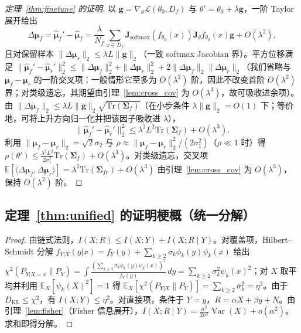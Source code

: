 \begin{proof}[定理~\ref{thm:finetune} 的证明]
以 $\mathbf{g}=\nabla_\theta\mathcal{L}(\theta_0,D_f)$ 与 $\theta'=\theta_0+\lambda\mathbf{g}$，一阶 Taylor 展开给出
\begin{equation}
\Delta\boldsymbol{\mu}_f=\hat{\boldsymbol{\mu}}_f'-\hat{\boldsymbol{\mu}}_f=\frac{\lambda}{N_f}\sum_{x\in D_f}\mathbf{J}_{\mathrm{softmax}}(f_{\theta_0}(x))\mathbf{J}_\theta f_{\theta_0}(x)\mathbf{g}+O(\lambda^2),
\end{equation}
且对保留样本 $\|\Delta\boldsymbol{\mu}_r\|_2\le\lambda L\|\mathbf{g}\|_2$（一致 softmax Jacobian 界）。平方位移满足 $\|\hat{\boldsymbol{\mu}}_f'-\hat{\boldsymbol{\mu}}_r'\|_2^2\le\|\Delta\boldsymbol{\mu}_f\|_2^2+\|\Delta\boldsymbol{\mu}_r\|_2^2+2\|\Delta\boldsymbol{\mu}_f\|_2\|\Delta\boldsymbol{\mu}_r\|_2$（我们省略与 $\boldsymbol{\mu}_f-\boldsymbol{\mu}_r$ 的一阶交叉项：一般情形它至多为 $O(\lambda^2)$ 阶，因此不改变首阶 $O(\lambda^2)$ 界；对类级遗忘，其期望由引理~\ref{lem:cross_cov} 为 $O(\lambda^3)$，故可吸收进余项）。由 $\|\Delta\boldsymbol{\mu}_f\|_2\le\lambda L\|\mathbf{g}\|_2\sqrt{\mathrm{Tr}(\boldsymbol{\Sigma}_f)}$（在小步条件 $\lambda\|\mathbf{g}\|_2=O(1)$ 下；等价地，可将上升方向归一化并把该因子吸收进 $\lambda$），
\begin{equation}
\|\hat{\boldsymbol{\mu}}_f'-\hat{\boldsymbol{\mu}}_r'\|_2^2\le\lambda^2L^2\mathrm{Tr}(\boldsymbol{\Sigma}_f)+O(\lambda^3).
\end{equation}
利用 $\|\boldsymbol{\mu}_f-\boldsymbol{\mu}_r\|_2=\sqrt{2}\sigma_2$ 与 $\rho\approx\|\boldsymbol{\mu}_f-\boldsymbol{\mu}_r\|_2^2/(2\sigma_1^2)$（$\rho\ll1$ 时）得 $\rho(\theta')\le\frac{\lambda^2L^2}{2\sigma_1^2}\mathrm{Tr}(\boldsymbol{\Sigma}_f)+O(\lambda^3)$。对类级遗忘，交叉项 $\mathbb{E}[\langle\Delta\boldsymbol{\mu}_f,\Delta\boldsymbol{\mu}_r\rangle]=\lambda^2\mathrm{Tr}(\boldsymbol{\Sigma}_{fr})+O(\lambda^3)$ 由引理~\ref{lem:cross_cov} 为 $O(\lambda^3)$，保持 $O(\lambda^2)$ 阶。
\end{proof}

\subsection{定理~\ref{thm:unified} 的证明梗概（统一分解）}
\label{app:unified}
\begin{proof}
由链式法则，$I(X;R) \le I(X;Y) + I(X;R\mid Y)$。对覆盖项，Hilbert--Schmidt 分解 $f_{Y|X}(y|x) = f_Y(y) + \sum_{k\ge 2}\sigma_k\phi_k(y)\psi_k(x)$ 给出 $\chi^2(P_{Y|X=x}\|P_Y)=\int\frac{(\sum_{k\ge2}\sigma_k\phi_k(y)\psi_k(x))^2}{f_Y(y)}\,dy=\sum_{k\ge2}\sigma_k^2\psi_k(x)^2$；对 $X$ 取平均并利用 $\mathbb{E}_X[\psi_k(X)^2]=1$ 得 $\mathbb{E}_X[\chi^2(P_{Y|X}\|P_Y)] = \sum_{k\ge 2}\sigma_k^2 = \eta^2$。由于 $D_{\mathrm{KL}} \le \chi^2$，有 $I(X;Y) \le \eta^2$。对直接项，条件于 $Y=y$，$R = \alpha X + \beta y + N$。由引理~\ref{lem:fisher}（Fisher 信息展开），$I(X;R\mid Y) = \frac{\alpha^2}{2\sigma^2}\operatorname{Var}(X) + o(\alpha^2)$。求和即得分解。
\end{proof}

